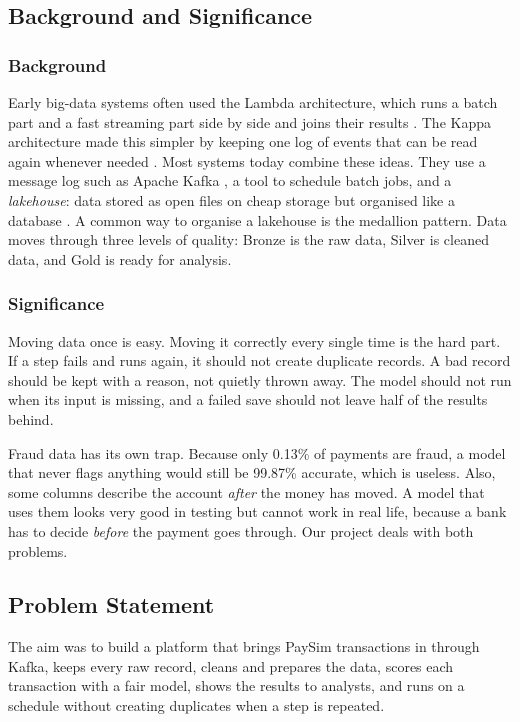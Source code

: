 \documentclass[11pt,a4paper]{article}
\begin{document}
\subsection{Background and Significance}

\subsubsection{Background}
Early big-data systems often used the Lambda architecture, which runs a batch
part and a fast streaming part side by side and joins their results
\citep{marz2015bigdata}. The Kappa architecture made this simpler by keeping one
log of events that can be read again whenever needed \citep{kreps2014lambda}.
Most systems today combine these ideas. They use a message log such as Apache
Kafka \citep{kreps2011kafka}, a tool to schedule batch jobs, and a
\emph{lakehouse}: data stored as open files on cheap storage but organised like
a database \citep{armbrust2021lakehouse}. A common way to organise a lakehouse is
the medallion pattern. Data moves through three levels of quality: Bronze is the
raw data, Silver is cleaned data, and Gold is ready for analysis.

\subsubsection{Significance}
Moving data once is easy. Moving it correctly every single time is the hard
part. If a step fails and runs again, it should not create duplicate records. A
bad record should be kept with a reason, not quietly thrown away. The model
should not run when its input is missing, and a failed save should not leave
half of the results behind.

Fraud data has its own trap. Because only 0.13\% of payments are fraud, a model
that never flags anything would still be 99.87\% accurate, which is useless.
Also, some columns describe the account \emph{after} the money has moved. A
model that uses them looks very good in testing but cannot work in real life,
because a bank has to decide \emph{before} the payment goes through. Our project
deals with both problems.

\subsection{Problem Statement}
The aim was to build a platform that brings PaySim transactions in through
Kafka, keeps every raw record, cleans and prepares the data, scores each
transaction with a fair model, shows the results to analysts, and runs on a
schedule without creating duplicates when a step is repeated.
\end{document}
